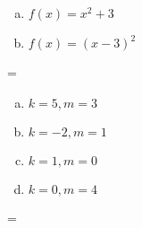 \documentclass {article}
\newenvironment{absolutelynopagebreak}
  {\par\nobreak\vfil\penalty0\vfilneg
   \vtop\bgroup}
  {\par\xdef\tpd{\the\prevdepth}\egroup
   \prevdepth=\tpd}
\begin{document}
\begin{absolutelynopagebreak}
\begin{enumerate}[a)]
\item $f(x) = x^2 + 3$
\item $f(x) = (x - 3)^2$
\end{enumerate}
\end{absolutelynopagebreak}

\begin{absolutelynopagebreak}
\begin{enumerate}[a)]
\item $k = 5, m = 3$
\item $k = -2, m = 1$
\item $k = 1, m = 0$
\item $k = 0, m = 4$
\end{enumerate}
\end{absolutelynopagebreak}
\end{document}
